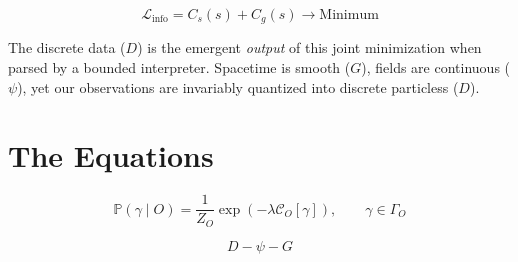 \begin{equation}
\mathcal{L}_{\text{info}} = C_s(s) + C_g(s) \longrightarrow \text{Minimum}
\end{equation}

The discrete data ($D$) is the emergent \emph{output} of this joint minimization when parsed by a bounded interpreter.
Spacetime is smooth ($G$), fields are continuous ($\psi$), yet our observations are invariably quantized into discrete particless ($D$).




\section{The Equations}


\begin{tcolorbox}[title=\iameverything]

\[
\mathbb{P}(\gamma \mid O) = \frac{1}{Z_O} \exp\left(-\lambda\mathcal{C}_O[\gamma]\right), \qquad \gamma \in \Gamma_O
\]

  
\[
D-\psi-G
\]


\end{tcolorbox}
